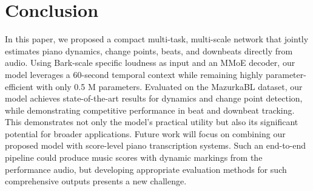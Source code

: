 \documentclass{article}
\begin{document}
\section{Conclusion}
\label{sec:concl}
In this paper, we proposed a compact multi-task, multi-scale network that jointly estimates piano dynamics, change points, beats, and downbeats directly from audio. Using Bark-scale specific loudness as input and an MMoE decoder, our model leverages a 60-second temporal context while remaining highly parameter-efficient with only 0.5 M parameters. Evaluated on the MazurkaBL dataset, our model achieves state-of-the-art results for dynamics and change point detection, while demonstrating competitive performance in beat and downbeat tracking. This demonstrates not only the model's practical utility but also its significant potential for broader applications. Future work will focus on combining our proposed model with score-level piano transcription systems. Such an end-to-end pipeline could produce music scores with dynamic markings from the performance audio, but developing appropriate evaluation methods for such comprehensive outputs presents a new challenge.


\end{document}
